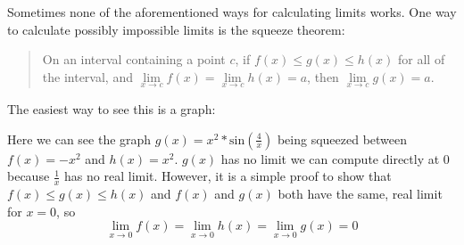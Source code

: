 \documentclass[../revisedMain.tex]{subfiles}
\begin{document}
	Sometimes none of the aforementioned ways for calculating limits works. One way to calculate possibly impossible limits is the squeeze theorem:
	\begin{quote}
		On an interval containing a point $c$, if $f(x)\leq g(x) \leq h(x)$ for all of the interval, and $\lim\limits_{x\to c} f(x) = \lim\limits_{x\to c} h(x) = a$, then $\lim\limits_{x\to c} g(x) = a$. 
	\end{quote}
	The easiest way to see this is a graph:
		\begin{center}
		\end{center}
		Here we can see the graph $g(x)=x^2*\text{sin}(\frac{4}{x})$ being squeezed between $f(x)=-x^2$ and $h(x)=x^2$. $g(x)$ has no limit we can compute directly at 0 because $\frac{1}{x}$ has no real limit. However, it is a simple proof to show that $f(x)\leq g(x) \leq h(x)$ and $f(x)$ and $g(x)$ both have the same, real limit for $x=0$, so $$\lim_{x\to 0} f(x) = \lim_{x\to 0} h(x) =\lim_{x\to 0} g(x)= 0$$
\end{document}
